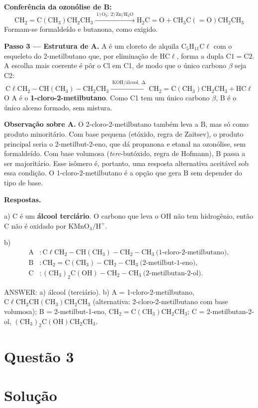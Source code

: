 \documentclass{article}%
\begin{document}
\textbf{Conferência da ozonólise de B:}
\[
\mathrm{CH_2{=}C(CH_3)CH_2CH_3 \xrightarrow{\;1)\,O_3;\ 2)\,Zn/H_2O\;} H_2C{=}O + CH_3C(=O)CH_2CH_3}
\]
Formam-se formaldeído e butanona, como exigido.

\textbf{Passo 3 --- Estrutura de A.}
A é um cloreto de alquila $\mathrm{C_5H_{11}C\ell}$ com o esqueleto do 2-metilbutano que, por eliminação de $\mathrm{HC\ell}$, forma a dupla $\mathrm{C1{=}C2}$. A escolha mais coerente é pôr o Cl em C1, de modo que o único carbono $\beta$ seja C2:
\[
\mathrm{C\ell CH_2{-}CH(CH_3){-}CH_2CH_3 \xrightarrow{\;\text{KOH/álcool},\ \Delta\;} CH_2{=}C(CH_3)CH_2CH_3 + HC\ell}
\]
O A é o \textbf{1-cloro-2-metilbutano}. Como C1 tem um único carbono $\beta$, B é o único alceno formado, sem mistura.

\textbf{Observação sobre A.} O 2-cloro-2-metilbutano também leva a B, mas só como produto minoritário. Com base pequena (etóxido, regra de Zaitsev), o produto principal seria o 2-metilbut-2-eno, que dá propanona e etanal na ozonólise, sem formaldeído. Com base volumosa (\emph{terc}-butóxido, regra de Hofmann), B passa a ser majoritário. Esse isômero é, portanto, uma resposta alternativa aceitável sob essa condição. O 1-cloro-2-metilbutano é a opção que gera B sem depender do tipo de base.

\textbf{Respostas.}

a) C é um \textbf{álcool terciário}. O carbono que leva o $\mathrm{OH}$ não tem hidrogênio, então C não é oxidado por $\mathrm{KMnO_4/H^+}$.

b)
\begin{align*}
\text{A} &: \mathrm{C\ell CH_2{-}CH(CH_3){-}CH_2{-}CH_3}\ \text{(1-cloro-2-metilbutano)},\\
\text{B} &: \mathrm{CH_2{=}C(CH_3){-}CH_2{-}CH_3}\ \text{(2-metilbut-1-eno)},\\
\text{C} &: \mathrm{(CH_3)_2C(OH){-}CH_2{-}CH_3}\ \text{(2-metilbutan-2-ol)}.
\end{align*}

ANSWER: a) álcool (terciário). b) A = 1-cloro-2-metilbutano, $\mathrm{C\ell CH_2CH(CH_3)CH_2CH_3}$ (alternativa: 2-cloro-2-metilbutano com base volumosa); B = 2-metilbut-1-eno, $\mathrm{CH_2{=}C(CH_3)CH_2CH_3}$; C = 2-metilbutan-2-ol, $\mathrm{(CH_3)_2C(OH)CH_2CH_3}$.%
\newpage%
\section*{Questão 3}

\section*{Solução}
\end{document}
